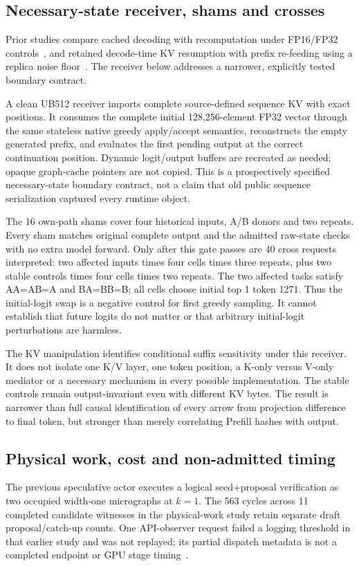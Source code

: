 \subsection{Necessary-state receiver, shams and crosses}
Prior studies compare cached decoding with recomputation under FP16/FP32 controls~\cite{cacheequivalence}, and retained decode-time KV resumption with prefix re-feeding using a replica noise floor~\cite{refeeding}. The receiver below addresses a narrower, explicitly tested boundary contract.

A clean UB512 receiver imports complete source-defined sequence KV with exact positions. It consumes the complete initial 128,256-element FP32 vector through the same stateless native greedy apply/accept semantics, reconstructs the empty generated prefix, and evaluates the first pending output at the correct continuation position. Dynamic logit/output buffers are recreated as needed; opaque graph-cache pointers are not copied. This is a prospectively specified necessary-state boundary contract, not a claim that old public sequence serialization captured every runtime object.

The 16 own-path shams cover four historical inputs, A/B donors and two repeats. Every sham matches original complete output and the admitted raw-state checks with no extra model forward. Only after this gate passes are 40 cross requests interpreted: two affected inputs times four cells times three repeats, plus two stable controls times four cells times two repeats. The two affected tasks satisfy AA=AB=A and BA=BB=B; all cells choose initial top 1 token 1271. Thus the initial-logit swap is a negative control for first greedy sampling. It cannot establish that future logits do not matter or that arbitrary initial-logit perturbations are harmless.

The KV manipulation identifies conditional suffix sensitivity under this receiver. It does not isolate one K/V layer, one token position, a K-only versus V-only mediator or a necessary mechanism in every possible implementation. The stable controls remain output-invariant even with different KV bytes. The result is narrower than full causal identification of every arrow from projection difference to final token, but stronger than merely correlating Prefill hashes with output.

\subsection{Physical work, cost and non-admitted timing}
The previous speculative actor executes a logical seed+proposal verification as two occupied width-one micrographs at $k=1$. The 563 cycles across 11 completed candidate witnesses in the physical-work study retain separate draft proposal/catch-up counts. One API-observer request failed a logging threshold in that earlier study and was not replayed; its partial dispatch metadata is not a completed endpoint or GPU stage timing~\cite{bwork}.

